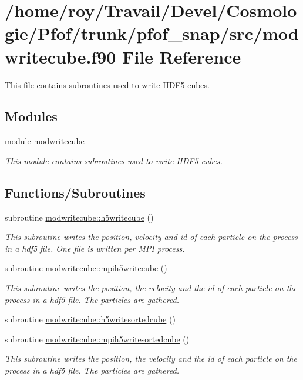 \hypertarget{modwritecube_8f90}{}\section{/home/roy/\+Travail/\+Devel/\+Cosmologie/\+Pfof/trunk/pfof\+\_\+snap/src/modwritecube.f90 File Reference}
\label{modwritecube_8f90}


This file contains subroutines used to write H\+D\+F5 cubes.  


\subsection*{Modules}
\begin{DoxyCompactItemize}
\item 
module \hyperlink{namespacemodwritecube}{modwritecube}
\begin{DoxyCompactList}\small\item\em This module contains subroutines used to write H\+D\+F5 cubes. \end{DoxyCompactList}\end{DoxyCompactItemize}
\subsection*{Functions/\+Subroutines}
\begin{DoxyCompactItemize}
\item 
subroutine \hyperlink{namespacemodwritecube_a99b5a6f7f4534196e666b125702c093f}{modwritecube\+::h5writecube} ()
\begin{DoxyCompactList}\small\item\em This subroutine writes the position, velocity and id of each particle on the process in a hdf5 file. One file is written per M\+PI process. \end{DoxyCompactList}\item 
subroutine \hyperlink{namespacemodwritecube_a0d94e39019f7808f3f373281ffe696a8}{modwritecube\+::mpih5writecube} ()
\begin{DoxyCompactList}\small\item\em This subroutine writes the position, the velocity and the id of each particle on the process in a hdf5 file. The particles are gathered. \end{DoxyCompactList}\item 
subroutine \hyperlink{namespacemodwritecube_a8af2220dcc73a35204f76527d4559e52}{modwritecube\+::h5writesortedcube} ()
\item 
subroutine \hyperlink{namespacemodwritecube_a491b7602123b1ac2d10637eb7c73ce77}{modwritecube\+::mpih5writesortedcube} ()
\begin{DoxyCompactList}\small\item\em This subroutine writes the position, the velocity and the id of each particle on the process in a hdf5 file. The particles are gathered. \end{DoxyCompactList}\end{DoxyCompactItemize}


